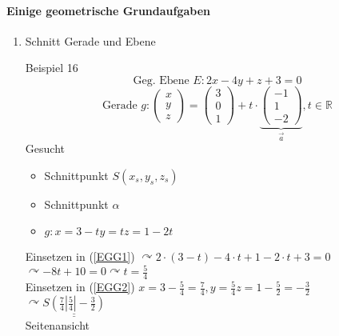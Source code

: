 \documentclass[a4paper]{scrartcl}
\begin{document}
\paragraph{Einige geometrische Grundaufgaben}
\begin{enumerate}
\item Schnitt Gerade und Ebene

Beispiel 16
\begin{equation}\label{EGG1}\text{Geg. Ebene }E: 2x -4y + z +3 = 0\end{equation}
\begin{equation}\label{EGG2}\text{Gerade } g: \begin{pmatrix}x\\y\\z\end{pmatrix} = \begin{pmatrix}3\\0\\1\end{pmatrix} + t \cdot \underbrace{\begin{pmatrix} -1 \\1 \\-2 \end{pmatrix}}_{\vec{a}}, t \in \mathbb{R} \end{equation}
Gesucht \begin{itemize}
\item Schnittpunkt $S(x_s,y_s,z_s)$
\item Schnittpunkt $\alpha$
\item $g: x=3-t y=t z=1-2t$
\end{itemize}
Einsetzen in (\ref{EGG1}) $\curvearrowright 2 \cdot (3-t) -4\cdot t + 1-2\cdot t +3 = 0$\\
$\curvearrowright -8t +10 = 0 \curvearrowright t = \frac{5}{4}$\\
Einsetzen in (\ref{EGG2}) $x=3 - \frac{5}{4} = \frac{7}{4}, y=\frac{5}{4} z= 1 - \frac{5}{2} = - \frac{3}{2}$\\
$\curvearrowright \underline{\underline{S(\frac{7}{4} | \frac{5}{4} | -\frac{3}{2} ) }}$\\
Seitenansicht\\
\end{enumerate}
\end{document}
